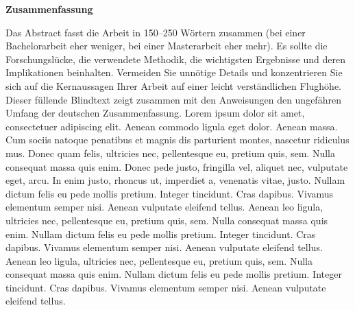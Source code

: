 \thispagestyle{empty}

\vspace*{1cm}

\begin{center}
    \textbf{Zusammenfassung}
\end{center}

\vspace*{1cm}

\noindent 
Das Abstract fasst die Arbeit in 150--250 Wörtern zusammen (bei einer Bachelorarbeit eher weniger, bei einer Masterarbeit eher mehr). Es sollte die Forschungslücke, die verwendete Methodik, die wichtigsten Ergebnisse und deren Implikationen beinhalten. Vermeiden Sie unnötige Details und konzentrieren Sie sich auf die Kernaussagen Ihrer Arbeit auf einer leicht verständlichen Flughöhe. Dieser füllende Blindtext zeigt zusammen mit den Anweisungen den ungefähren Umfang der deutschen Zusammenfassung. Lorem ipsum dolor sit amet, consectetuer adipiscing elit. Aenean commodo ligula eget dolor. Aenean massa. Cum sociis natoque penatibus et magnis dis parturient montes, nascetur ridiculus mus. Donec quam felis, ultricies nec, pellentesque eu, pretium quis, sem. Nulla consequat massa quis enim. Donec pede justo, fringilla vel, aliquet nec, vulputate eget, arcu. In enim justo, rhoncus ut, imperdiet a, venenatis vitae, justo. Nullam dictum felis eu pede mollis pretium. Integer tincidunt. Cras dapibus. Vivamus elementum semper nisi. Aenean vulputate eleifend tellus. Aenean leo ligula, ultricies nec, pellentesque eu, pretium quis, sem. Nulla consequat massa quis enim. Nullam dictum felis eu pede mollis pretium. Integer tincidunt. Cras dapibus. Vivamus elementum semper nisi. Aenean vulputate eleifend tellus. Aenean leo ligula, ultricies nec, pellentesque eu, pretium quis, sem. Nulla consequat massa quis enim. Nullam dictum felis eu pede mollis pretium. Integer tincidunt. Cras dapibus. Vivamus elementum semper nisi. Aenean vulputate eleifend tellus.

